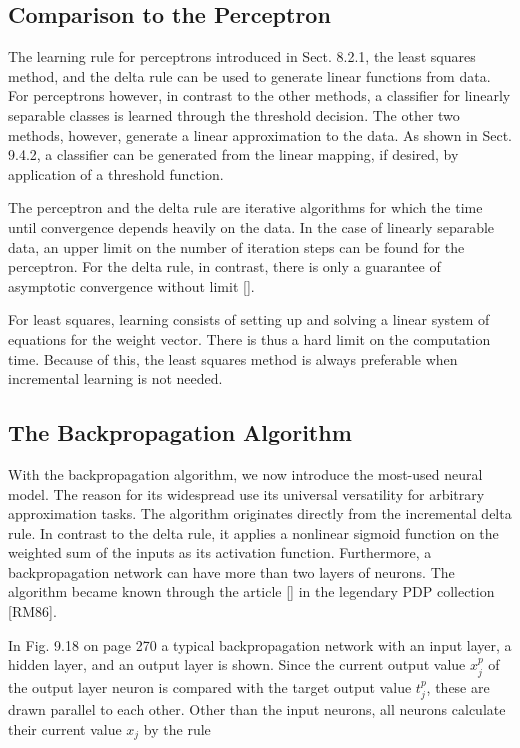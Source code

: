 \documentclass[10pt]{book}
\begin{document}
\subsection{Comparison to the Perceptron}
The learning rule for perceptrons introduced in Sect. 8.2.1, the least squares method, and the delta rule can be used to generate linear functions from data. For perceptrons however, in contrast to the other methods, a classifier for linearly separable classes is learned through the threshold decision. The other two methods, however, generate a linear approximation to the data. As shown in Sect. 9.4.2, a classifier can be generated from the linear mapping, if desired, by application of a threshold function.

The perceptron and the delta rule are iterative algorithms for which the time until convergence depends heavily on the data. In the case of linearly separable data, an upper limit on the number of iteration steps can be found for the perceptron. For the delta rule, in contrast, there is only a guarantee of asymptotic convergence without limit [\cite{hertz1991neural}].

For least squares, learning consists of setting up and solving a linear system of equations for the weight vector. There is thus a hard limit on the computation time. Because of this, the least squares method is always preferable when incremental learning is not needed.

\subsection{The Backpropagation Algorithm}
With the backpropagation algorithm, we now introduce the most-used neural model. The reason for its widespread use its universal versatility for arbitrary approximation tasks. The algorithm originates directly from the incremental delta rule. In contrast to the delta rule, it applies a nonlinear sigmoid function on the weighted sum of the inputs as its activation function. Furthermore, a backpropagation network can have more than two layers of neurons. The algorithm became known through the article [\cite{rumelhart1986bp}] in the legendary PDP collection [RM86].

In Fig. 9.18 on page 270 a typical backpropagation network with an input layer, a hidden layer, and an output layer is shown. Since the current output value $x_{j}^{p}$ of the output layer neuron is compared with the target output value $t_{j}^{p}$, these are drawn parallel to each other. Other than the input neurons, all neurons calculate their current value $x_{j}$ by the rule
\end{document}
